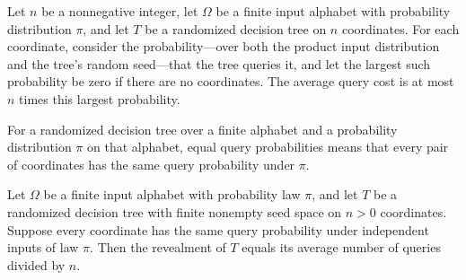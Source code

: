 \begin{theorem}
\label{FABL.RandomizedDecisionTree.averageCost_le_card_mul_revealment}
\leanok
{}
Let $n$ be a nonnegative integer, let $\Omega$ be a finite input alphabet with
probability distribution $\pi$, and let $T$ be a randomized decision tree on $n$
coordinates. For each coordinate, consider the probability—over both the product input
distribution and the tree's random seed—that the tree queries it, and let the largest
such probability be zero if there are no coordinates. The average query cost is at most
$n$ times this largest probability.
\end{theorem}

\begin{definition}
\label{FABL.RandomizedDecisionTree.HasEqualQueryProbabilities}
\leanok
{}
For a randomized decision tree over a finite alphabet and a probability distribution
$\pi$ on that alphabet, equal query probabilities means that every pair of coordinates
has the same query probability under $\pi$.
\end{definition}

\begin{theorem}
\label{FABL.RandomizedDecisionTree.revealment_eq_averageCost_div}
\leanok
{}
Let $\Omega$ be a finite input alphabet with probability law $\pi$, and let $T$ be a
randomized decision tree with finite nonempty seed space on $n>0$ coordinates. Suppose
every coordinate has the same query probability under independent inputs of law $\pi$.
Then the revealment of $T$ equals its average number of queries divided by $n$.
\end{theorem}

